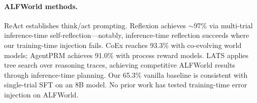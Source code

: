 \paragraph{ALFWorld methods.}
ReAct \cite{yao2023react} establishes think/act prompting. Reflexion \cite{shinn2023reflexion} achieves $\sim$97\% via multi-trial inference-time self-reflection---notably, inference-time reflection succeeds where our training-time injection fails. CoEx \cite{kim2025coex} reaches 93.3\% with co-evolving world models; AgentPRM \cite{agentprm2025} achieves 91.0\% with process reward models. LATS \cite{zhou2024lats} applies tree search over reasoning traces, achieving competitive ALFWorld results through inference-time planning. Our 65.3\% vanilla baseline is consistent with single-trial SFT on an 8B model. No prior work has tested training-time error injection on ALFWorld.
